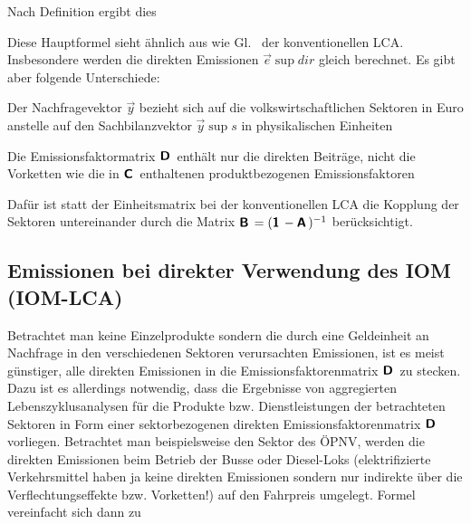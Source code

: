 Nach Definition ergibt dies

%
Diese Hauptformel sieht \"ahnlich aus wie Gl.~
der konventionellen LCA. Insbesondere werden die direkten Emissionen
$\vec{e}\sup{dir}$ gleich berechnet. Es gibt aber folgende Unterschiede:
\bi
\item
Der Nachfragevektor $\vec{y}$ bezieht sich auf die volkswirtschaftlichen
Sektoren in Euro anstelle auf den Sachbilanzvektor $\vec{y}\sup{s}$ in physikalischen
Einheiten
\item 
Die Emissionsfaktormatrix $\textbf{\textsf{D}}\,$ enth\"alt nur die direkten
Beitr\"age, nicht die Vorketten wie die in $\textbf{\textsf{C}}\,$ enthaltenen produktbezogenen
Emissionsfaktoren
\item Daf\"ur ist statt der Einheitsmatrix bei der konventionellen LCA
  die Kopplung der Sektoren untereinander durch die Matrix
  $\textbf{\textsf{B}}\,=(\textbf{\textsf{1}}\,-\textbf{\textsf{A}}\,)^{-1}$ ber\"ucksichtigt.
\ei

\subsection{Emissionen bei direkter Verwendung des
  IOM (IOM-LCA)}

Betrachtet man keine Einzelprodukte sondern die durch eine Geldeinheit
an Nachfrage in den verschiedenen Sektoren verursachten Emissionen,
ist es meist g\"unstiger, alle direkten Emissionen in die
Emissionsfaktorenmatrix $\textbf{\textsf{D}}\,$ zu stecken. Dazu ist es allerdings
notwendig, dass die Ergebnisse von aggregierten Lebenszyklusanalysen
f\"ur die Produkte bzw. Dienstleistungen der 
betrachteten Sektoren in Form einer sektorbezogenen direkten
Emissionsfaktorenmatrix $\textbf{\textsf{D}}\,$ vorliegen. Betrachtet man beispielsweise
den Sektor des \"OPNV, werden die direkten Emissionen beim Betrieb der Busse
oder Diesel-Loks (elektrifizierte Verkehrsmittel haben ja keine
direkten Emissionen sondern nur indirekte \"uber die
Verflechtungseffekte bzw. Vorketten!) auf den Fahrpreis
umgelegt. Formel~ vereinfacht sich dann zu

